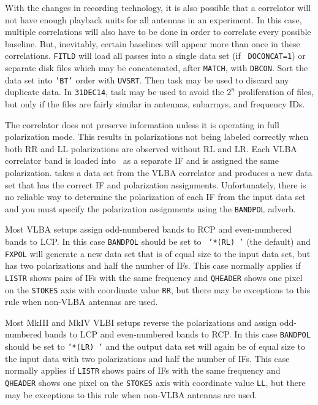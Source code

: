 With the changes in recording technology, it is also possible that a
correlator will not have enough playback units for all antennas in an
experiment.  In this case, multiple correlations will also have to be
done in order to correlate every possible baseline.  But, inevitably,
certain baselines will appear more than once in these correlations.
{\tt FITLD} will load all passes into a single data set (if {\tt
DOCONCAT=1}) or separate disk files which may be concatenated, after
{\tt MATCH}, with {\tt DBCON}\@.  Sort the data set into {\tt 'BT'}
order with {\tt UVSRT}\@.  Then task {\tt {}} may be used to
discard any duplicate data.  In {\tt 31DEC14}, task {\tt {}}
may be used to avoid the $2^n$ proliferation of files, but only if the
files are fairly similar in antennas, subarrays, and frequency IDs.



The  correlator does not preserve 
information unless it is operating in full polarization mode.  This
results in polarizations not being labeled correctly when both RR and
LL polarizations are observed without RL and LR\@.  Each VLBA
correlator band is loaded into \AIPS\ as a separate IF and is
assigned the same polarization.  {\tt {}} takes a data set
from the VLBA correlator and produces a new data set that has the
correct IF and polarization assignments.  Unfortunately, there is no
reliable way to determine the polarization of each IF from the input
data set  and you must specify the polarization assignments using the
{\tt BANDPOL} adverb.

Most VLBA setups assign odd-numbered bands to RCP and even-numbered
bands to LCP\@.  In this case {\tt BANDPOL} should be set to {\tt
'*(RL) '} (the default) and {\tt FXPOL} will generate a new data set
that is of equal size to the input data set, but has two polarizations
and half the number of IFs.  This case normally applies if {\tt LISTR}
shows pairs of IFs with the same frequency and {\tt QHEADER} shows one
pixel on the {\tt STOKES} axis with coordinate value {\tt RR}, but
there may be exceptions to this rule when non-VLBA antennas are used.

Most MkIII and MkIV VLBI setups reverse the polarizations and assign
odd-numbered bands to LCP and even-numbered bands to RCP\@.  In this
case {\tt BANDPOL} should be set to {\tt '*(LR) '} and the output data
set will again be of equal size to the input data with two
polarizations and half the number of IFs.  This case normally applies
if {\tt LISTR} shows pairs of IFs with the same frequency and {\tt
QHEADER} shows one pixel on the {\tt STOKES} axis with coordinate
value {\tt LL}, but there may be exceptions to this rule when non-VLBA
antennas are used.

